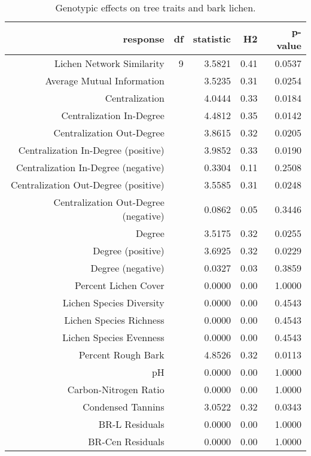 \begin{table}[ht]
\centering
\begin{tabular}{rrrrr}
  \hline
response & df & statistic & H2 & p-value \\ 
  \hline
Lichen Network Similarity & 9 & 3.5821 & 0.41 & 0.0537 \\ 
  Average Mutual Information &  & 3.5235 & 0.31 & 0.0254 \\ 
  Centralization &  & 4.0444 & 0.33 & 0.0184 \\ 
  Centralization In-Degree &  & 4.4812 & 0.35 & 0.0142 \\ 
  Centralization Out-Degree &  & 3.8615 & 0.32 & 0.0205 \\ 
  Centralization In-Degree (positive) &  & 3.9852 & 0.33 & 0.0190 \\ 
  Centralization In-Degree (negative) &  & 0.3304 & 0.11 & 0.2508 \\ 
  Centralization Out-Degree (positive) &  & 3.5585 & 0.31 & 0.0248 \\ 
  Centralization Out-Degree (negative) &  & 0.0862 & 0.05 & 0.3446 \\ 
  Degree &  & 3.5175 & 0.32 & 0.0255 \\ 
  Degree (positive) &  & 3.6925 & 0.32 & 0.0229 \\ 
  Degree (negative) &  & 0.0327 & 0.03 & 0.3859 \\ 
  Percent Lichen Cover &  & 0.0000 & 0.00 & 1.0000 \\ 
  Lichen Species Diversity &  & 0.0000 & 0.00 & 0.4543 \\ 
  Lichen Species Richness &  & 0.0000 & 0.00 & 0.4543 \\ 
  Lichen Species Evenness &  & 0.0000 & 0.00 & 0.4543 \\ 
  Percent Rough Bark &  & 4.8526 & 0.32 & 0.0113 \\ 
  pH &  & 0.0000 & 0.00 & 1.0000 \\ 
  Carbon-Nitrogen Ratio &  & 0.0000 & 0.00 & 1.0000 \\ 
  Condensed Tannins &  & 3.0522 & 0.32 & 0.0343 \\ 
  BR-L Residuals &  & 0.0000 & 0.00 & 1.0000 \\ 
  BR-Cen Residuals &  & 0.0000 & 0.00 & 1.0000 \\ 
   \hline
\end{tabular}
\caption{Genotypic effects on tree traits and bark lichen.} 
\label{tab:h2_table}
\end{table}
